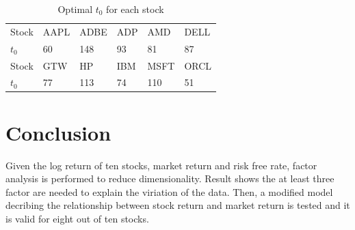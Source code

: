 \documentclass[10pt, conference]{IEEEtran}
\begin{document}
\begin{table}[!h]
\centering
\caption{Optimal $t_0$ for each stock}
\label{tab3}
\begin{tabular}{llllll}
\hline
Stock & AAPL & ADBE & ADP & AMD  & DELL \\
$t_0$    & 60   & 148  & 93  & 81   & 87   \\
\hline
Stock & GTW  & HP   & IBM & MSFT & ORCL \\
$t_0$    & 77   & 113  & 74  & 110  & 51  \\
\hline
\end{tabular}
\end{table}


\section{Conclusion}
Given the log return of ten stocks, market return and risk free rate, factor analysis is performed to reduce dimensionality. Result shows the at least three factor are needed to explain the viriation of the data. Then, a modified model decribing the relationship between stock return and market return is tested and it is valid for eight out of ten stocks. 









\end{document}
